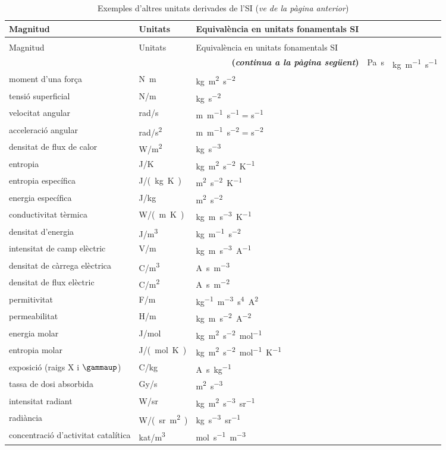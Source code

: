\begin{longtable}[h]{lll}
   \caption{\label{taula:SI-derivades-exemples} Exemples d'altres unitats derivades de
   l'SI}\\
   \toprule[1pt]
    Magnitud &  Unitats & Equivalència en unitats fonamentals SI\\
   \midrule
   \endfirsthead
   \caption[]{Exemples d'altres unitats derivades de l'SI (\emph{ve de la pàgina
   anterior})}\\
   \toprule[1pt]
    Magnitud &  Unitats & Equivalència en unitats fonamentals SI\\
   \midrule
   \endhead
   \midrule
   \multicolumn{3}{r}{\sffamily\bfseries\color{NavyBlue}(\emph{continua a la pàgina següent})}
   \endfoot
   \endlastfoot
   viscositat dinàmica &  \unit{Pa.s}& \unit{kg.m^{-1}.s^{-1}} \\
   moment d'una força & \unit{N.m} & \unit{kg.m^2.s^{-2}} \\
   tensió superficial &  \unit{N/m} &   \unit{kg.s^{-2}} \\
   velocitat angular & \unit{rad/s} & \unit{m.m^{-1}.s^{-1}} = \unit{s^{-1}} \\
   acceleració angular & \unit{rad/s^2} & \unit{m.m^{-1}.s^{-2}} = \unit{s^{-2}} \\
   densitat de flux de calor & \unit{W/m^2} & \unit{kg.s^{-3}} \\
   entropia & \unit{J/K} & \unit{kg.m^2.s^{-2}.K^{-1}} \\
   entropia específica & \unit{J/(kg.K)} &\unit{m^2.s^{-2}.K^{-1}} \\
   energia específica & \unit{J/kg} & \unit{m^2.s^{-2}} \\
   conductivitat tèrmica & \unit{W/(m.K)} & \unit{kg.m.s^{-3}.K^{-1}} \\
   densitat d'energia & \unit{J/m^3} & \unit{kg.m^{-1}.s^{-2}} \\
   intensitat de camp elèctric & \unit{V/m}& \unit{kg.m.s^{-3}.A^{-1}}  \\
   densitat de càrrega elèctrica & \unit{C/m^3} & \unit{A.s.m^{-3}} \\
   densitat de flux elèctric & \unit{C/m^2} & \unit{A.s.m^{-2}}\\
   permitivitat &  \unit{F/m}& \unit{kg^{-1}.m^{-3}.s^4.A^2} \\
   permeabilitat &  \unit{H/m} & \unit{kg.m.s^{-2}.A^{-2}} \\
   energia molar & \unit{J/mol} & \unit{kg.m^2.s^{-2}.mol^{-1}} \\
   entropia molar& \unit{J/(mol.K)} & \unit{kg.m^2.s^{-2}.mol^{-1}.K^{-1}} \\
   exposició (raigs X i $\gammaup$) & \unit{C/kg} & \unit{A.s.kg^{-1}} \\
   tassa de dosi absorbida & \unit{Gy/s} & \unit{m^2.s^{-3}}\\
   intensitat radiant & \unit{W/sr} & \unit{kg.m^2.s^{-3}.sr^{-1}} \\
   radiància & \unit{W/(sr.m^2)} & \unit{kg.s^{-3}.sr^{-1}} \\
   concentració d'activitat catalítica &  \unit{kat/m^3} & \unit{mol.s^{-1}.m^{-3}}\\
    \bottomrule[1pt]
\end{longtable}
